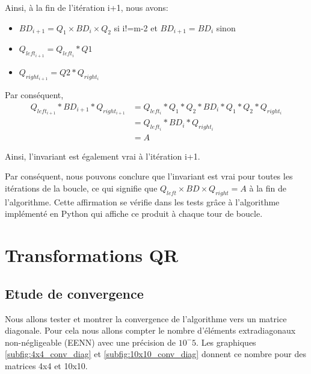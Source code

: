 \documentclass{article}
\begin{document}
Ainsi, à la fin de l'itération i+1, nous avons:

\begin{itemize}
  \item $BD_{i+1} = Q_{1} \times BD_{i} \times Q_{2}$ si i!=m-2 et $BD_{i+1} = BD_{i}$ sinon
  \item $Q_{left_{i+1}} = Q_{left_{i}} * Q1$
  \item $Q_{right_{i+1}} = Q2 * Q_{right_{i}}$
\end{itemize}

Par conséquent,
\begin{align}
  Q_{left_{i+1}} * BD_{i+1} * Q_{right_{i+1}} &= Q_{left_{i}} * Q_1 * Q_2 * BD_{i} * Q_1 * Q_2 * Q_{right_{i}} \\
                                          &= Q_{left_{i}} * BD_{i} * Q_{right_{i}} \\
                                          &= A
\end{align}


Ainsi, l'invariant est également vrai à l'itération i+1.

Par conséquent, nous pouvons conclure que l'invariant est vrai pour toutes les itérations de la boucle, ce qui signifie que $Q_{left} \times BD \times Q_{right} = A$ à la fin de l'algorithme.
Cette affirmation se vérifie dans les tests grâce à l'algorithme implémenté en Python qui affiche ce produit à chaque tour de boucle.

\section{Transformations QR}
\label{sec:transfo_qr}

\subsection{Etude de convergence}
\label{ssec:conv_qr}

Nous allons tester et montrer la convergence de l'algorithme vers un matrice diagonale. Pour cela nous allons compter le nombre d'éléments extradiagonaux non-négligeable (EENN) avec une précision de $10^-5$. Les graphiques \ref{subfig:4x4_conv_diag} et \ref{subfig:10x10_conv_diag} donnent ce nombre pour des matrices 4x4 et 10x10.
\end{document}
